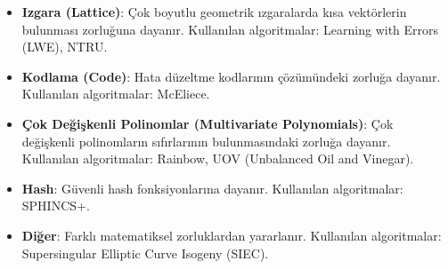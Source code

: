 \begin{itemize}
    \item \textbf{Izgara (Lattice)}: Çok boyutlu geometrik ızgaralarda kısa vektörlerin bulunması zorluğuna dayanır. Kullanılan algoritmalar: Learning with Errors (LWE), NTRU.
    \item \textbf{Kodlama (Code)}: Hata düzeltme kodlarının çözümündeki zorluğa dayanır. Kullanılan algoritmalar: McEliece.
    \item \textbf{Çok Değişkenli Polinomlar (Multivariate Polynomials)}: Çok değişkenli polinomların sıfırlarının bulunmasındaki zorluğa dayanır. Kullanılan algoritmalar: Rainbow, UOV (Unbalanced Oil and Vinegar).
    \item \textbf{Hash}: Güvenli hash fonksiyonlarına dayanır. Kullanılan algoritmalar: SPHINCS+.
    \item \textbf{Diğer}: Farklı matematiksel zorluklardan yararlanır. Kullanılan algoritmalar: Supersingular Elliptic Curve Isogeny (SIEC).
\end{itemize}



\newpage